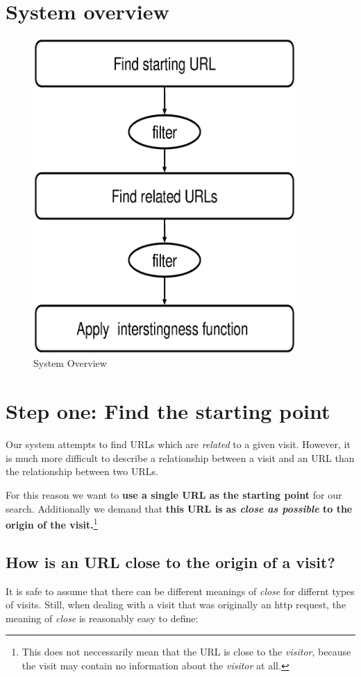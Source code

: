 \documentclass[a4paper]{danarticle}
\begin{document}
  \section*{System overview}
    \begin{figure}
      \centering
      \includegraphics[width=10cm]{steps_overview.eps}
      \caption{System Overview}
    \end{figure}
  \section*{Step one: Find the starting point}
    Our system attempts to find URLs which are \textit{related} to
    a given visit. However, it is much more difficult to describe
    a relationship between a visit and an URL than the relationship
    between two URLs.
    
    For this reason we want to \textbf{use a single URL as the
    starting point} for our search. Additionally we demand that
    \textbf{this URL is as \textit{close as possible} to the
    origin of the visit.}\footnote{This does not neccessarily
    mean that the URL is close to the \textit{visitor}, because
    the visit may contain no information about the \textit{visitor}
    at all.}
    
    \subsection*{How is an URL close to the origin of a visit?}
      It is safe to assume that there can be different meanings
      of \textit{close} for differnt types of visits. Still, when
      dealing with a visit that was originally an http request,
      the meaning of \textit{close} is reasonably easy to define:
      
\end{document}
